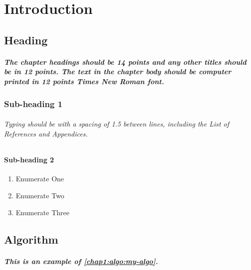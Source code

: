 \chapter{Introduction}
\label{chapter1}





\section{Heading}


\paragraph{The chapter headings should be 14 points and any other titles should be in 12 points.  The text in the chapter body should be computer printed in 12 points Times New Roman font.}



\subsection{Sub-heading 1}

\subparagraph{
Typing should be with a spacing of 1.5 between lines, including the List of References and Appendices.
}






\subsubsection{Sub-heading 2}

\subsubparagraph{
\lipsum[1][1-3] %
}

\begin{enumerate}
\item Enumerate One
\item Enumerate Two
\item Enumerate Three
\end{enumerate}





\section{Algorithm}

\paragraph{This is an example of \autoref{chap1:algo:my-algo}.}


